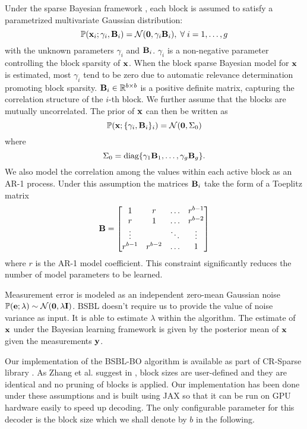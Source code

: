Under the sparse Bayesian framework \cite{zhang2013extension},
each block is assumed to satisfy a parametrized multivariate
Gaussian distribution:
\begin{equation}
\mathbb{P}(\mathbf{x}_i ; \gamma_i, \mathbf{B}_i) 
= \mathcal{N}(\mathbf{0}, \gamma_i \mathbf{B}_i), \; \forall \; i=1,\dots,g
\end{equation}
with the unknown parameters $\gamma_i$ and $\mathbf{B}_i$.
$\gamma_i$ is a non-negative parameter controlling the
block sparsity of $\mathbf{x}$. When the block sparse Bayesian
model for $\mathbf{x}$ is estimated, most $\gamma_i$ tend to
be zero due to automatic relevance determination
\cite{tipping2001sparse} promoting block sparsity.
$\mathbf{B}_i \in \mathbb{R}^{b \times b}$ is a positive definite
matrix, capturing the correlation structure of the $i$-th
block.
We further assume that the blocks are mutually uncorrelated.
The prior of $\mathbf{x}$ can then be written as
\begin{equation}
\mathbb{P}(\mathbf{x}; \{ \gamma_i, \mathbf{B}_i\}_i ) = \mathcal{N}(\mathbf{0}, \Sigma_0)
\end{equation}
where
\begin{equation}
\Sigma_0 = \text{diag}\{\gamma_1 \mathbf{B}_1, \dots, \gamma_g \mathbf{B}_g \}.
\end{equation}
We also model the correlation among the values
within each active block as an AR-1 process.
Under this assumption the matrices
$\mathbf{B}_i$ take the form of a Toeplitz matrix
\begin{equation}
\mathbf{B} = \begin{bmatrix}
1 & r & \dots & r^{b-1}\\
r & 1 & \dots & r^{b-2}\\
\vdots &  & \ddots & \vdots\\
r^{b-1} & r^{b-2} & \dots & 1
\end{bmatrix}
\end{equation}
where $r$ is the AR-1 model coefficient.
This constraint significantly reduces
the number of model parameters to be learned.

Measurement error is modeled as an independent zero-mean Gaussian
noise $\mathbb{P}(\mathbf{e}; \lambda) \sim \mathcal{N}(\mathbf{0}, \lambda \mathbf{I})$.
BSBL doesn't require us to provide the value of noise variance
as input.
It is able to estimate $\lambda$ within the algorithm.
The estimate of $\mathbf{x}$ under the Bayesian learning framework
is given by the posterior mean of $\mathbf{x}$ given the measurements $\mathbf{y}$.

Our implementation of the BSBL-BO algorithm is available as part of
CR-Sparse library \cite{kumar2021cr}.
As Zhang et al. suggest in \cite{zhang2012compressed},
block sizes are user-defined and they are identical and
no pruning of blocks is applied. Our implementation has been
done under these assumptions and is built using JAX so that it can
be run on GPU hardware easily to speed up decoding.
The only configurable parameter for this decoder is the block size
which we shall denote by $b$ in the following.

